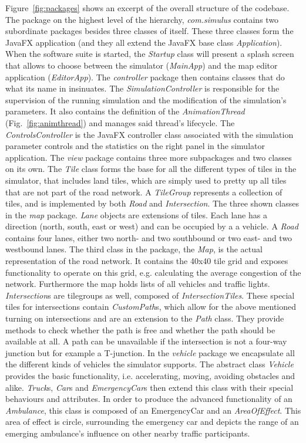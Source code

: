 Figure~\ref{fig:packages} shows an excerpt of the overall structure of the codebase. The package on the highest level of the hierarchy, \textit{com.simulus} contains two subordinate packages besides three classes of itself. These three classes form the JavaFX application (and they all extend the JavaFX base class \textit{Application}). When the software suite is started, the \textit{Startup} class will present a splash screen that allows to choose between the simulator (\textit{MainApp}) and the map editor application (\textit{EditorApp}).
The \textit{controller} package then contains classes that do what its name in insinuates. The \textit{SimulationController} is responsible for the supervision of the running simulation and the modification of the simulation's parameters.  It also contains the definition of the \textit{AnimationThread} (Fig.~\ref{fig:animthread}) and manages said thread's lifecycle. The \textit{ControlsController} is the JavaFX controller class associated with the simulation parameter controls and the statistics on the right panel in the simulator application. 
The \textit{view} package contains three more subpackages and two classes on its own. The \textit{Tile} class forms the base for all the different types of tiles in the simulator, that includes land tiles, which are simply used to pretty up all tiles that are not part of the road network. A \textit{TileGroup} represents a collection of tiles, and is implemented by both \textit{Road} and \textit{Intersection}.  The three shown classes in the \textit{map} package. \textit{Lane} objects are extensions of tiles. Each lane has a direction (north, south, east or west) and can be occupied by a a vehicle. A \textit{Road} contains four lanes, either two north- and two southbound or two east- and two westbound lanes. The third class in the package, the \textit{Map}, is the actual representation of the road network. It contains the 40x40 tile grid and exposes functionality to operate on this grid, e.g. calculating the average congestion of the network. Furthermore the map holds lists of all vehicles and traffic lights. \textit{Intersection}s are tilegroups as well, composed of \textit{IntersectionTiles}. These special tiles for intersections contain \textit{CustomPath}s, which allow for the above mentioned turning on intersections and are an extension to the \textit{Path} class. They provide methods to check whether the path is free and whether the path should be available at all. A path can be unavailable if the intersection is not a four-way junction but for example a T-junction.  
In the \textit{vehicle} package we encapsulate all the different kinds of vehicles the simulator supports. The abstract class \textit{Vehicle} provides the basic functionality, i.e. accelerating, moving, avoiding obstacles and alike. \textit{Truck}s, \textit{Car}s and \textit{EmergencyCar}s then extend this class with their special behaviours and attributes. In order to produce the advanced functionality of an \textit{Ambulance}, this class is composed of an EmergencyCar and an \textit{AreaOfEffect}. This area of effect is circle, surrounding the emergency car and depicts the range of an emerging ambulance's influence on other nearby traffic participants.

